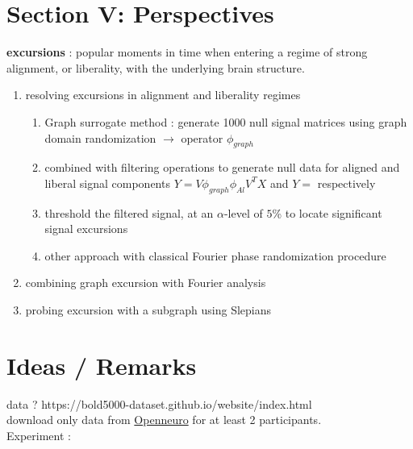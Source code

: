 \documentclass[12pt]{article}
\begin{document}
\section{Section V: Perspectives }
\textbf{excursions} : popular moments in time when entering a regime of strong alignment, or liberality, with the underlying brain structure. 
\begin{enumerate}
    \item resolving excursions in alignment and liberality regimes 
                \begin{enumerate}
                \item Graph surrogate method : generate 1000 null signal matrices using graph domain randomization $\rightarrow$ operator $\phi_{graph}$
                \item combined with filtering operations to generate null data for aligned and liberal signal components $Y=V\phi_{graph}\phi_{Al}V^TX$ and $Y= $ respectively 
                \item threshold the filtered signal, at an $\alpha$-level of $5$\% to locate significant signal excursions
                \item other approach with classical Fourier phase randomization procedure
            \end{enumerate}
    \item combining graph excursion with Fourier analysis
    \item probing excursion with a subgraph using Slepians
\end{enumerate}


\section{Ideas / Remarks }
data ? https://bold5000-dataset.github.io/website/index.html \\ 
download only data from \href{https://openneuro.org/datasets/ds001499/versions/1.3.0}{Openneuro} for at least 2 participants. \\ 

Experiment : \\
\end{document}
